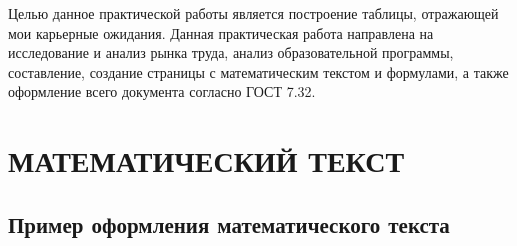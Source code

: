 \documentclass[14pt]{extreport}
\begin{document}
\pagestyle{empty} %


\pagestyle{plain} %
\tableofcontents
 



\intro\label{intro}



Целью данное практической работы является построение таблицы, отражающей мои карьерные ожидания. Данная практическая работа направлена на исследование и анализ рынка труда, анализ образовательной программы, составление, создание страницы с математическим текстом и формулами, а также оформление всего документа согласно ГОСТ 7.32.


\chapter{МАТЕМАТИЧЕСКИЙ ТЕКСТ\label{chapter1}}
\section{Пример оформления математического текста}
\end{document}
